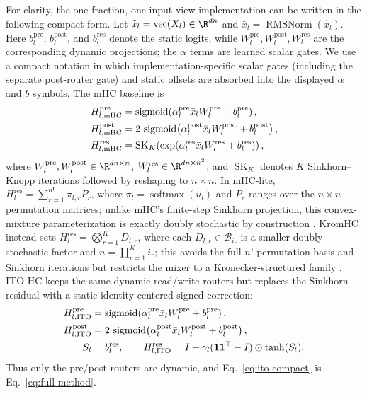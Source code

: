 \documentclass{article}
\newcommand{\Hpre}{H^{\mathrm{pre}}}
\newcommand{\Hpost}{H^{\mathrm{post}}}
\newcommand{\Hres}{H^{\mathrm{res}}}
\begin{document}
For clarity, the one-fraction, one-input-view implementation can be written in
the following compact form. Let $\widehat x_l=\operatorname{vec}(X_l)\in\R^{dn}$ and
 $\bar x_l=\operatorname{RMSNorm}(\widehat x_l)$. Here $b_l^{\mathrm{pre}}$,
 $b_l^{\mathrm{post}}$, and $b_l^{\mathrm{res}}$ denote the static logits,
 while $W_l^{\mathrm{pre}},W_l^{\mathrm{post}},W_l^{\mathrm{res}}$ are the
 corresponding dynamic projections; the $\alpha$ terms are learned scalar
 gates. We use a compact notation in which implementation-specific scalar
 gates (including the separate post-router gate) and static offsets are
 absorbed into the displayed $\alpha$ and $b$ symbols. The mHC baseline is
\begin{align}
 \Hpre_{l,\mathrm{mHC}} &= \operatorname{sigmoid}\!\left(\alpha_l^{\mathrm{pre}}\bar x_lW_l^{\mathrm{pre}}+b_l^{\mathrm{pre}}\right),\notag\\
 \Hpost_{l,\mathrm{mHC}} &= 2\,\operatorname{sigmoid}\!\left(\alpha_l^{\mathrm{post}}\bar x_lW_l^{\mathrm{post}}+b_l^{\mathrm{post}}\right),\notag\\
 \Hres_{l,\mathrm{mHC}} &= \operatorname{SK}_{K}\!\left(\exp\!\left(\alpha_l^{\mathrm{res}}\bar x_lW_l^{\mathrm{res}}+b_l^{\mathrm{res}}\right)\right),
 \label{eq:mhc-compact}
\end{align}
where $W_l^{\mathrm{pre}},W_l^{\mathrm{post}}\in\R^{dn\times n}$,
 $W_l^{\mathrm{res}}\in\R^{dn\times n^2}$, and $\operatorname{SK}_{K}$
 denotes $K$ Sinkhorn--Knopp iterations followed by reshaping to $n\times n$.
In mHC-lite, $\Hres_l=\sum_{r=1}^{n!}\pi_{l,r}P_r$, where $\pi_l=\operatorname{softmax}(u_l)$ and $P_r$ ranges over the $n\times n$ permutation matrices; unlike mHC's finite-step Sinkhorn projection, this convex-mixture parameterization is exactly doubly stochastic by construction \citep{yang2026mhclite}. KromHC instead sets $\Hres_l=\bigotimes_{r=1}^{K}D_{l,r}$, where each $D_{l,r}\in\mathcal B_{i_r}$ is a smaller doubly stochastic factor and $n=\prod_{r=1}^{K}i_r$; this avoids the full $n!$ permutation basis and Sinkhorn iterations but restricts the mixer to a Kronecker-structured family \citep{zhou2026kromhc}.
ITO-HC keeps the same dynamic read/write routers but replaces the Sinkhorn
 residual with a static identity-centered signed correction:
\begin{align}
 \Hpre_{l,\mathrm{ITO}} &= \operatorname{sigmoid}\!\left(\alpha_l^{\mathrm{pre}}\bar x_lW_l^{\mathrm{pre}}+b_l^{\mathrm{pre}}\right),\notag\\
 \Hpost_{l,\mathrm{ITO}} &= 2\,\operatorname{sigmoid}\!\left(\alpha_l^{\mathrm{post}}\bar x_lW_l^{\mathrm{post}}+b_l^{\mathrm{post}}\right),\notag\\
 S_l &= b_l^{\mathrm{res}},\qquad\Hres_{l,\mathrm{ITO}}=I+\gamma_l(\mathbf1\mathbf1^\top-I)\odot\tanh(S_l).
 \label{eq:ito-compact}
\end{align}
Thus only the pre/post routers are dynamic, and Eq.~\ref{eq:ito-compact} is Eq.~\ref{eq:full-method}.
\end{document}
